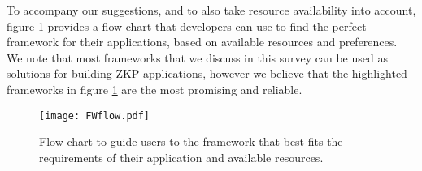To accompany our suggestions, and to also take resource availability into account, figure \ref{fig:flow} provides a flow chart that developers can use to find the perfect framework for their applications, based on available resources and preferences. We note that most frameworks that we discuss in this survey can be used as solutions for building ZKP applications, however we believe that the highlighted frameworks in figure \ref{fig:flow} are the most promising and reliable.

\begin{figure}
    \centering
    {\texttt{[image: FWflow.pdf]}}
    \caption{Flow chart to guide users to the framework that best fits the requirements of their application and available resources.}
    \label{fig:flow}
\end{figure}